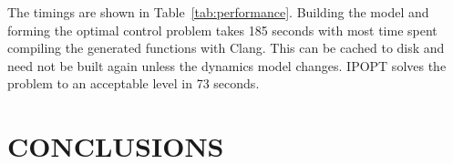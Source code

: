 \documentclass[11pt,twocolumn]{article}
\begin{document}
The timings are shown in Table~\ref{tab:performance}. Building the model and
forming the optimal control problem takes 185 seconds with most time spent
compiling the generated functions with Clang. This can be cached to disk and
need not be built again unless the dynamics model changes. IPOPT solves the
problem to an acceptable level in 73 seconds.

\section*{CONCLUSIONS}



\end{document}
